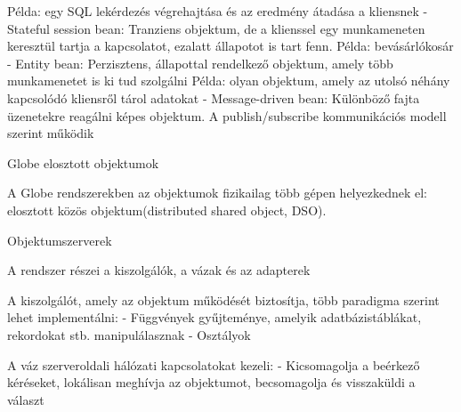 \documentclass[twoside, a4paper, 12pt]{article}
\begin{document}
\begin{description}
                                                                        Példa: egy SQL lekérdezés végrehajtása és az eredmény átadása a kliensnek
                                                                        - Stateful session bean: Tranziens objektum, de a klienssel egy munkameneten keresztül tartja a kapcsolatot,
                                                                        ezalatt állapotot is tart fenn. Példa: bevásárlókosár
                                                                        - Entity bean: Perzisztens, állapottal rendelkező objektum, amely több munkamenetet is ki tud szolgálni
                                                                        Példa: olyan objektum, amely az utolsó néhány kapcsolódó kliensről tárol adatokat
                                                                        - Message-driven bean: Különböző fajta üzenetekre reagálni képes objektum. A publish/subscribe kommunikációs
                                                                        modell szerint működik
                                                                    \item  Globe elosztott objektumok
                                                                    \item A Globe rendszerekben az objektumok fizikailag több gépen helyezkednek el: elosztott közös objektum(distributed shared object, DSO).
                                                                    \item  Objektumszerverek
                                                                    \item A rendszer részei a kiszolgálók, a vázak és az adapterek
                                                                    \item A kiszolgálót, amely az objektum működését biztosítja, több paradigma szerint lehet implementálni:
                                                                        - Függvények gyűjteménye, amelyik adatbázistáblákat, rekordokat stb.
                                                                        manipulálasznak
                                                                        - Osztályok
                                                                    \item A váz szerveroldali hálózati kapcsolatokat kezeli:
                                                                        - Kicsomagolja a beérkező kéréseket, lokálisan meghívja az objektumot, becsomagolja és visszaküldi a választ

\end{description}
\end{document}
